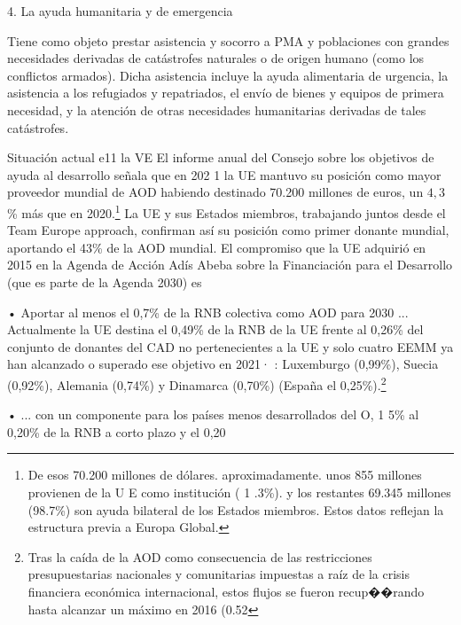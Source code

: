 \documentclass[10pt,a4paper]{article}
\begin{document}
{4. La ayuda humanitaria y de emergencia

Tiene como objeto prestar asistencia y socorro a PMA y poblaciones con grandes necesidades derivadas de catástrofes naturales o de origen humano (como los conflictos armados). Dicha asistencia incluye la ayuda alimentaria de urgencia, la asistencia a los refugiados y repatriados, el envío de bienes y equipos de primera necesidad, y la atención de otras necesidades humanitarias derivadas de tales catástrofes.

Situación actual e11 la VE 
El informe anual del Consejo sobre los objetivos de ayuda al desarrollo señala que en 202 1 la UE mantuvo su posición como mayor proveedor mundial de AOD habiendo destinado 70.200 millones de euros, un $4,3$\% más que en 2020.\footnote{%
    De esos 70.200 millones de dólares. aproximadamente. unos 855 millones provienen de la U E como institución ( 1 .3\%). y los restantes 69.345 millones (98.7\%) son ayuda bilateral de los Estados miembros. Estos datos reflejan la estructura previa a Europa Global.
} La UE y sus Estados miembros, trabajando juntos desde el Team Europe approach, confirman así su posición como primer donante mundial, aportando el 43\% de la AOD mundial. El compromiso que la UE adquirió en 2015 en la Agenda de Acción Adís Abeba sobre la Financiación para el Desarrollo (que es parte de la Agenda 2030) es

• Aportar al menos el 0,7\% de la RNB colectiva como AOD para 2030 ... Actualmente la UE destina el 0,49\% de la RNB de la UE frente al 0,26\% del conjunto de donantes del CAD no pertenecientes a la UE y solo cuatro EEMM ya han alcanzado o superado ese objetivo en 2021· : Luxemburgo (0,99\%), Suecia (0,92\%), Alemania (0,74\%) y Dinamarca (0,70\%) (España el 0,25\%).\footnote{%
    Tras la caída de la AOD como consecuencia de las restricciones presupuestarias nacionales y comunitarias impuestas a raíz de la crisis financiera económica internacional, estos flujos se fueron recup��rando hasta alcanzar un máximo en 2016 (0.52%
}


• ... con un componente para los países menos desarrollados del O, 1 5\% al 0,20\% de la RNB a corto plazo y el 0,20%

}
\end{document}
